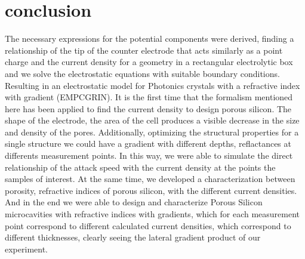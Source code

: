 \documentclass{article}
\begin{document}
\section{conclusion}
The necessary expressions for the potential components were derived,
finding a relationship of the tip of the counter electrode that acts
similarly as a point charge and the current density for a geometry in
a rectangular electrolytic box and we solve the electrostatic
equations with suitable boundary conditions. Resulting in an
electrostatic model for  Photonics crystals with a refractive index
with gradient (EMPCGRIN).
It is the first time that the formalism mentioned here has been
applied to find the current density to design porous silicon. The
shape of the electrode, the area of the cell produces a visible
decrease in the size and density of the pores. Additionally,
optimizing the structural properties for a single structure we could
have a gradient with different depths, reflactances at differents
measurement points. In this way, we were able to simulate the direct
relationship of the attack speed with the current density at the
points  the samples of interest. At the same time, we developed a
characterization between porosity, refractive indices of porous
silicon, with the different current densities. And in the end we were
able to design and characterize Porous Silicon microcavities with
refractive indices with gradients, which for each measurement point
correspond to different calculated current densities, which correspond
to different thicknesses, clearly seeing the lateral gradient product
of our experiment.
\end{document}
